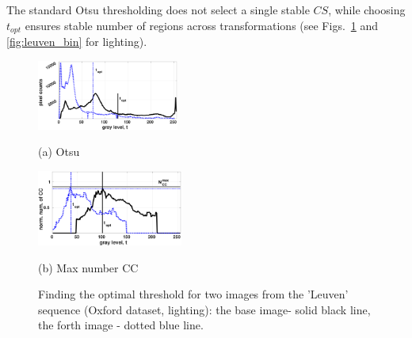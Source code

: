 \documentclass{article}
\begin{document}
The standard Otsu thresholding does not select a single stable $CS$, while choosing $t_{opt}$ ensures stable number of regions across transformations (see Figs.~\ref{fig:binary_hist} and \ref{fig:leuven_bin} for lighting).
\begin{figure}[htb]

\begin{minipage}[b]{0.49\linewidth}
  \centering
  \centerline{\includegraphics[width=4.65cm]{./Figs/hist_otsu_leuven_1_4}}
  \centerline{(a) Otsu}\medskip
\end{minipage}
\hfill
\begin{minipage}[b]{0.49\linewidth}
  \centering
  \centerline{\includegraphics[width=4.8cm]{./Figs/hist_numcc_leuven_1_4}}
\centerline{(b) Max number CC}\medskip
\end{minipage}
\hfill
\vspace{-0.5cm}
\caption{Finding the optimal threshold for two images from the 'Leuven' sequence 
(Oxford dataset, lighting): the base image- solid black line, the forth image - dotted blue line.}
\label{fig:binary_hist}
%
\end{figure}
\end{document}
